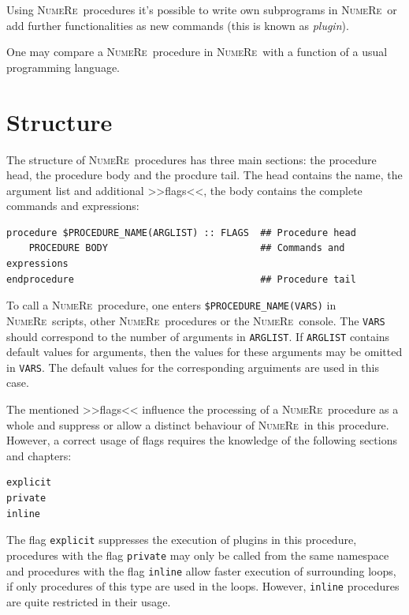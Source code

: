 \documentclass[DIV=14,headsepline,footsepline]{scrbook}
\newcommand{\NR}{\textsc{Nu\-me\-Re}}
\begin{document}
				Using \NR\ procedures it's possible to write own subprograms in \NR\ or add further functionalities as new commands (this is known as \emph{plugin}).
				
				One may compare a \NR\ procedure in \NR\ with a function of a usual programming language.
								
			\section{Structure}
				The structure of \NR\ procedures has three main sections: the procedure head, the procedure body and the procdure tail. The head contains the name, the argument list and additional >>flags<<, the body contains the complete commands and expressions:
				\begin{lstlisting}
procedure $PROCEDURE_NAME(ARGLIST) :: FLAGS  ## Procedure head
	PROCEDURE BODY                           ## Commands and expressions
endprocedure                                 ## Procedure tail
				\end{lstlisting}
				To call a \NR\ procedure, one enters \lstinline+$PROCEDURE_NAME(VARS)+ in \NR\ scripts, other \NR\ procedures or the \NR\ console. The \lstinline+VARS+ should correspond to the number of arguments in \lstinline+ARGLIST+. If \lstinline+ARGLIST+ contains default values for arguments, then the values for these arguments may be omitted in \lstinline+VARS+. The default values for the corresponding arguiments are used in this case.
				
				The mentioned >>flags<< influence the processing of a \NR\ procedure as a whole and suppress or allow a distinct behaviour of \NR\ in this procedure. However, a correct usage of flags requires the knowledge of the following sections and chapters:
				\begin{lstlisting}
explicit
private
inline
				\end{lstlisting}
				The flag \lstinline+explicit+ suppresses the execution of plugins in this procedure, procedures with the flag \lstinline+private+ may only be called from the same namespace and procedures with the flag \lstinline+inline+ allow faster execution of surrounding loops, if only procedures of this type are used in the loops. However, \lstinline+inline+ procedures are quite restricted in their usage.
				
\end{document}
